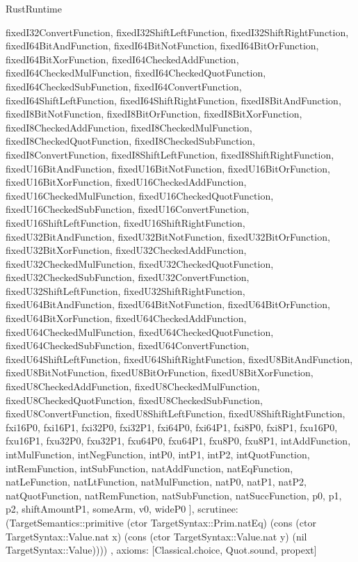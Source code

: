 \begin{lexlean}{RustRuntime}
\begin{semanticmodule}
{{      fixedI32ConvertFunction,
      fixedI32ShiftLeftFunction,
      fixedI32ShiftRightFunction,
      fixedI64BitAndFunction,
      fixedI64BitNotFunction,
      fixedI64BitOrFunction,
      fixedI64BitXorFunction,
      fixedI64CheckedAddFunction,
      fixedI64CheckedMulFunction,
      fixedI64CheckedQuotFunction,
      fixedI64CheckedSubFunction,
      fixedI64ConvertFunction,
      fixedI64ShiftLeftFunction,
      fixedI64ShiftRightFunction,
      fixedI8BitAndFunction,
      fixedI8BitNotFunction,
      fixedI8BitOrFunction,
      fixedI8BitXorFunction,
      fixedI8CheckedAddFunction,
      fixedI8CheckedMulFunction,
      fixedI8CheckedQuotFunction,
      fixedI8CheckedSubFunction,
      fixedI8ConvertFunction,
      fixedI8ShiftLeftFunction,
      fixedI8ShiftRightFunction,
      fixedU16BitAndFunction,
      fixedU16BitNotFunction,
      fixedU16BitOrFunction,
      fixedU16BitXorFunction,
      fixedU16CheckedAddFunction,
      fixedU16CheckedMulFunction,
      fixedU16CheckedQuotFunction,
      fixedU16CheckedSubFunction,
      fixedU16ConvertFunction,
      fixedU16ShiftLeftFunction,
      fixedU16ShiftRightFunction,
      fixedU32BitAndFunction,
      fixedU32BitNotFunction,
      fixedU32BitOrFunction,
      fixedU32BitXorFunction,
      fixedU32CheckedAddFunction,
      fixedU32CheckedMulFunction,
      fixedU32CheckedQuotFunction,
      fixedU32CheckedSubFunction,
      fixedU32ConvertFunction,
      fixedU32ShiftLeftFunction,
      fixedU32ShiftRightFunction,
      fixedU64BitAndFunction,
      fixedU64BitNotFunction,
      fixedU64BitOrFunction,
      fixedU64BitXorFunction,
      fixedU64CheckedAddFunction,
      fixedU64CheckedMulFunction,
      fixedU64CheckedQuotFunction,
      fixedU64CheckedSubFunction,
      fixedU64ConvertFunction,
      fixedU64ShiftLeftFunction,
      fixedU64ShiftRightFunction,
      fixedU8BitAndFunction,
      fixedU8BitNotFunction,
      fixedU8BitOrFunction,
      fixedU8BitXorFunction,
      fixedU8CheckedAddFunction,
      fixedU8CheckedMulFunction,
      fixedU8CheckedQuotFunction,
      fixedU8CheckedSubFunction,
      fixedU8ConvertFunction,
      fixedU8ShiftLeftFunction,
      fixedU8ShiftRightFunction,
      fxi16P0,
      fxi16P1,
      fxi32P0,
      fxi32P1,
      fxi64P0,
      fxi64P1,
      fxi8P0,
      fxi8P1,
      fxu16P0,
      fxu16P1,
      fxu32P0,
      fxu32P1,
      fxu64P0,
      fxu64P1,
      fxu8P0,
      fxu8P1,
      intAddFunction,
      intMulFunction,
      intNegFunction,
      intP0,
      intP1,
      intP2,
      intQuotFunction,
      intRemFunction,
      intSubFunction,
      natAddFunction,
      natEqFunction,
      natLeFunction,
      natLtFunction,
      natMulFunction,
      natP0,
      natP1,
      natP2,
      natQuotFunction,
      natRemFunction,
      natSubFunction,
      natSuccFunction,
      p0,
      p1,
      p2,
      shiftAmountP1,
      someArm,
      v0,
      wideP0
    ],
    scrutinee: (TargetSemantics::primitive (ctor TargetSyntax::Prim.natEq) (cons (ctor TargetSyntax::Value.nat x) (cons (ctor TargetSyntax::Value.nat y) (nil TargetSyntax::Value))))
  },
  axioms: [Classical.choice, Quot.sound, propext]
}


\end{semanticmodule}
\end{lexlean}
